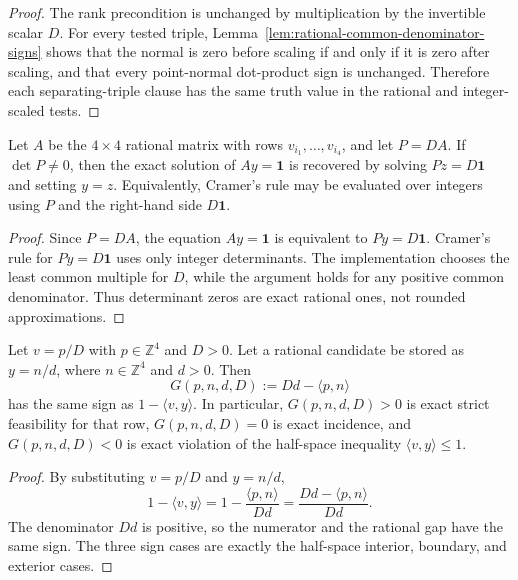 \begin{proof}
The rank precondition is unchanged by multiplication by the invertible scalar
$D$.  For every tested triple, Lemma~\ref{lem:rational-common-denominator-signs}
shows that the normal is zero before scaling if and only if it is zero after
scaling, and that every point-normal dot-product sign is unchanged.  Therefore
each separating-triple clause has the same truth value in the rational and
integer-scaled tests.
\end{proof}

\begin{lemma}
\label{lem:integer-scaled-polar-candidates}
Let $A$ be the $4 \times 4$ rational matrix with rows $v_{i_1},\ldots,v_{i_4}$,
and let $P = DA$.  If $\det P \neq 0$, then the exact solution of
$Ay=\mathbf{1}$ is recovered by solving $Pz=D\mathbf{1}$ and setting $y=z$.
Equivalently, Cramer's rule may be evaluated over integers using $P$ and the
right-hand side $D\mathbf{1}$.
\end{lemma}

\begin{proof}
Since $P=DA$, the equation $Ay=\mathbf{1}$ is equivalent to $Py=D\mathbf{1}$.  Cramer's
rule for $Py=D\mathbf{1}$ uses only integer determinants.  The implementation
chooses the least common multiple for $D$, while the argument holds for any
positive common denominator.  Thus determinant zeros are exact rational
ones, not rounded approximations.
\end{proof}

\begin{lemma}
\label{lem:integer-scaled-feasibility-gap}
Let $v=p/D$ with $p\in\mathbb{Z}^4$ and $D>0$.  Let a rational candidate be
stored as $y=n/d$, where $n\in\mathbb{Z}^4$ and $d>0$.  Then
\[
  G(p,n,d,D) := Dd-\langle p,n\rangle
\]
has the same sign as $1-\langle v,y\rangle$.  In particular,
$G(p,n,d,D) > 0$ is exact strict feasibility for that row,
$G(p,n,d,D) = 0$ is exact incidence, and $G(p,n,d,D) < 0$ is exact violation
of the half-space inequality $\langle v,y\rangle \le 1$.
\end{lemma}

\begin{proof}
By substituting $v=p/D$ and $y=n/d$,
\[
  1-\langle v,y\rangle
  =
  1-\frac{\langle p,n\rangle}{Dd}
  =
  \frac{Dd-\langle p,n\rangle}{Dd}.
\]
The denominator $Dd$ is positive, so the numerator and the rational gap have
the same sign.  The three sign cases are exactly the half-space interior,
boundary, and exterior cases.
\end{proof}
